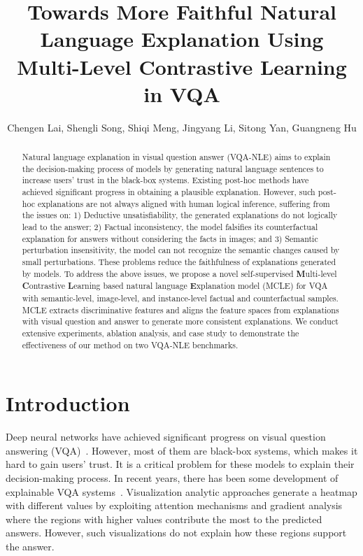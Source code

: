 \documentclass[letterpaper]{article} %
\title{Towards More Faithful Natural Language Explanation Using Multi-Level Contrastive Learning in VQA}
\author {
    Chengen Lai,
    Shengli Song,
    Shiqi Meng,
    Jingyang Li,
    Sitong Yan,
    Guangneng Hu
}
\begin{document}
\maketitle

\begin{abstract}
Natural language explanation in visual question answer (VQA-NLE) aims to explain the decision-making process of models by generating natural language sentences to increase users' trust in the black-box systems. Existing post-hoc methods have achieved significant progress in obtaining a plausible explanation. However, such post-hoc explanations are not always aligned with human logical inference, suffering from the issues on: 1) Deductive unsatisfiability, the generated explanations do not logically lead to the answer; 2) Factual inconsistency, the model falsifies its counterfactual explanation for answers without considering the facts in images; and 3) Semantic perturbation insensitivity, the model can not recognize the semantic changes caused by small perturbations. These problems reduce the faithfulness of explanations generated by models. To address the above issues, we propose a novel self-supervised \textbf{M}ulti-level \textbf{C}ontrastive \textbf{L}earning based natural language \textbf{E}xplanation model (MCLE) for VQA  with semantic-level, image-level, and instance-level factual and counterfactual samples. MCLE extracts discriminative features and aligns the feature spaces from explanations with visual question and answer to generate more consistent explanations. We conduct extensive experiments, ablation analysis, and case study to demonstrate the effectiveness of our method on two VQA-NLE benchmarks.
\end{abstract}


\section{Introduction}

Deep neural networks have achieved significant progress on visual question answering (VQA)~\cite{antol2015vqa}. However, most of them are black-box systems, which makes it hard to gain users' trust. It is a critical problem for these models to explain their decision-making process. In recent years, there has been some development of explainable VQA systems~\cite{patro2019u,chen2022rex}. Visualization analytic approaches generate a heatmap with different values by exploiting attention mechanisms and gradient analysis~\cite{lu2016hierarchical,selvaraju2017grad} where the regions with higher values contribute the most to the predicted answers. However, such visualizations do not explain how these regions support the answer.
\end{document}
